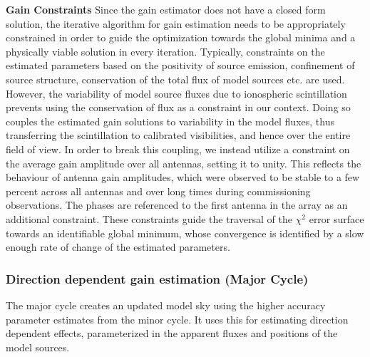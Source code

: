 \documentclass{aa}
\begin{document}
\textbf{Gain Constraints}  Since the  gain estimator does  not have  a closed
form  solution,  the  iterative  algorithm  for  gain  estimation  needs  to  be
appropriately constrained in order to  guide the optimization towards the global
minima  and  a  physically   viable  solution  in  every  iteration.  Typically,
constraints  on the  estimated  parameters  based on  the  positivity of  source
emission, confinement  of source  structure, conservation of  the total  flux of
model sources  etc. are used.  However,  the variability of  model source fluxes
due to  ionospheric scintillation prevents using  the conservation of  flux as a
constraint in  our context.   Doing so couples  the estimated gain  solutions to
variability  in  the  model  fluxes,  thus  transferring  the  scintillation  to
calibrated visibilities, and  hence over the entire field of  view.  In order to
break  this  coupling, we  instead  utilize a  constraint  on  the average  gain
amplitude over all antennas, setting it to unity. This reflects the behaviour of
antenna  gain amplitudes,  which were  observed to  be stable  to a  few percent
across all antennas and over  long times during commissioning observations.  The
phases  are referenced  to  the first  antenna  in the  array  as an  additional
constraint.   These constraints  guide  the traversal  of  the $\chi^{2}$  error
surface towards an identifiable  global minimum, whose convergence is identified
by a slow enough rate of change of the estimated parameters.

\subsubsection{\label{sub:Direction-dependent-gain}Direction dependent gain estimation
(Major Cycle)}  The major cycle  creates an updated  model sky using  the higher
accuracy parameter estimates  from the minor cycle. It  uses this for estimating
direction dependent effects, parameterized  in the apparent fluxes and positions
of the model sources.
\end{document}
